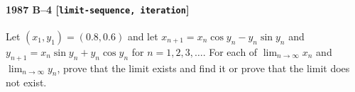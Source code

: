 \paragraph{1987 B--4 \textnormal{[\texttt{limit-sequence, iteration}]}}
Let $(x_1,y_1) = (0.8, 0.6)$ and let $x_{n+1} = x_n \cos y_n - y_n
\sin y_n$ and $y_{n+1}= x_n \sin y_n + y_n \cos y_n$ for
$n=1,2,3,\dots$. For each of $\lim_{n\to \infty} x_n$ and $\lim_{n \to
\infty} y_n$, prove that the limit exists and find it or prove that
the limit does not exist.
